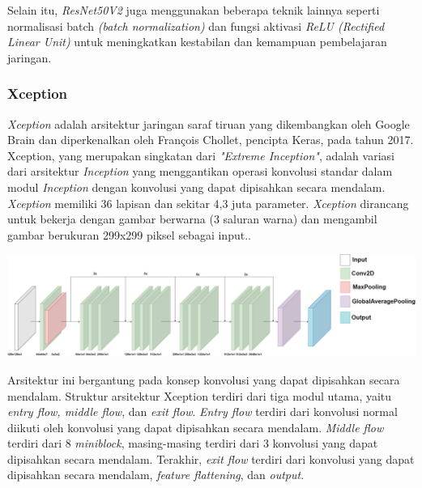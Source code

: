 Selain itu, \textit{ResNet50V2} juga menggunakan beberapa teknik lainnya seperti normalisasi batch \textit{(batch normalization)} dan fungsi aktivasi \textit{ReLU (Rectified Linear Unit)} untuk meningkatkan kestabilan dan kemampuan pembelajaran jaringan. \cite{prusty2022resnet50v2}

\subsubsection{Xception}
\textit{Xception} adalah arsitektur jaringan saraf tiruan yang dikembangkan oleh Google Brain dan diperkenalkan oleh François Chollet, pencipta Keras, pada tahun 2017. Xception, yang merupakan singkatan dari \textit{"Extreme Inception"}, adalah variasi dari arsitektur \textit{Inception} yang menggantikan operasi konvolusi standar dalam modul \textit{Inception} dengan konvolusi yang dapat dipisahkan secara mendalam. \textit{Xception} memiliki 36 lapisan dan sekitar 4,3 juta parameter. \textit{Xception} dirancang untuk bekerja dengan gambar berwarna (3 saluran warna) dan mengambil gambar berukuran 299x299 piksel sebagai input.. \cite{chollet2017xception}

\begin{center}
  \includegraphics[width=1.0\linewidth]{gambar/bener/Arsitektur_CNNXception.png}
  \label{fig:Arsitektur Xception}
\end{center}

Arsitektur ini bergantung pada konsep konvolusi yang dapat dipisahkan secara mendalam. Struktur arsitektur Xception terdiri dari tiga modul utama, yaitu \textit{entry flow, middle flow}, dan \textit{exit flow}. \textit{Entry flow} terdiri dari konvolusi normal diikuti oleh konvolusi yang dapat dipisahkan secara mendalam. \textit{Middle flow} terdiri dari 8 \textit{miniblock}, masing-masing terdiri dari 3 konvolusi yang dapat dipisahkan secara mendalam. Terakhir, \textit{exit flow} terdiri dari konvolusi yang dapat dipisahkan secara mendalam, \textit{feature flattening}, dan \textit{output}.

